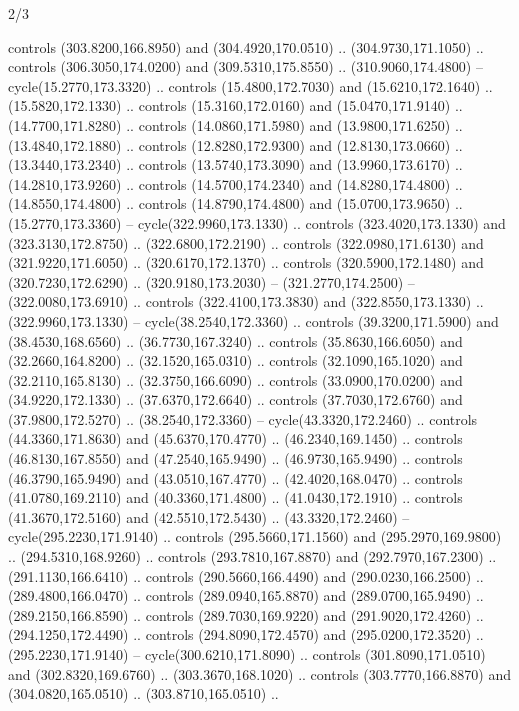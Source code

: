 \begin{flagdescription}{2/3}
\begin{scope}[xshift=0.5\flaglength,yshift=0.5\flagwidth,scale=\stretchfactor]
\begin{scope}[scale=0.001645\flagwidth,yshift=65mm,xshift=-63mm]
\begin{scope}[y=0.80pt, x=0.80pt, yscale=-1,]
\begin{scope}[cm={{1.33333,0.0,0.0,1.33333,(0.0,1e-05)}}]
  controls (303.8200,166.8950) and (304.4920,170.0510) .. (304.9730,171.1050) ..
  controls (306.3050,174.0200) and (309.5310,175.8550) .. (310.9060,174.4800) --
  cycle(15.2770,173.3320) .. controls (15.4800,172.7030) and (15.6210,172.1640)
  .. (15.5820,172.1330) .. controls (15.3160,172.0160) and (15.0470,171.9140) ..
  (14.7700,171.8280) .. controls (14.0860,171.5980) and (13.9800,171.6250) ..
  (13.4840,172.1880) .. controls (12.8280,172.9300) and (12.8130,173.0660) ..
  (13.3440,173.2340) .. controls (13.5740,173.3090) and (13.9960,173.6170) ..
  (14.2810,173.9260) .. controls (14.5700,174.2340) and (14.8280,174.4800) ..
  (14.8550,174.4800) .. controls (14.8790,174.4800) and (15.0700,173.9650) ..
  (15.2770,173.3360) -- cycle(322.9960,173.1330) .. controls (323.4020,173.1330)
  and (323.3130,172.8750) .. (322.6800,172.2190) .. controls (322.0980,171.6130)
  and (321.9220,171.6050) .. (320.6170,172.1370) .. controls (320.5900,172.1480)
  and (320.7230,172.6290) .. (320.9180,173.2030) -- (321.2770,174.2500) --
  (322.0080,173.6910) .. controls (322.4100,173.3830) and (322.8550,173.1330) ..
  (322.9960,173.1330) -- cycle(38.2540,172.3360) .. controls (39.3200,171.5900)
  and (38.4530,168.6560) .. (36.7730,167.3240) .. controls (35.8630,166.6050)
  and (32.2660,164.8200) .. (32.1520,165.0310) .. controls (32.1090,165.1020)
  and (32.2110,165.8130) .. (32.3750,166.6090) .. controls (33.0900,170.0200)
  and (34.9220,172.1330) .. (37.6370,172.6640) .. controls (37.7030,172.6760)
  and (37.9800,172.5270) .. (38.2540,172.3360) -- cycle(43.3320,172.2460) ..
  controls (44.3360,171.8630) and (45.6370,170.4770) .. (46.2340,169.1450) ..
  controls (46.8130,167.8550) and (47.2540,165.9490) .. (46.9730,165.9490) ..
  controls (46.3790,165.9490) and (43.0510,167.4770) .. (42.4020,168.0470) ..
  controls (41.0780,169.2110) and (40.3360,171.4800) .. (41.0430,172.1910) ..
  controls (41.3670,172.5160) and (42.5510,172.5430) .. (43.3320,172.2460) --
  cycle(295.2230,171.9140) .. controls (295.5660,171.1560) and
  (295.2970,169.9800) .. (294.5310,168.9260) .. controls (293.7810,167.8870) and
  (292.7970,167.2300) .. (291.1130,166.6410) .. controls (290.5660,166.4490) and
  (290.0230,166.2500) .. (289.4800,166.0470) .. controls (289.0940,165.8870) and
  (289.0700,165.9490) .. (289.2150,166.8590) .. controls (289.7030,169.9220) and
  (291.9020,172.4260) .. (294.1250,172.4490) .. controls (294.8090,172.4570) and
  (295.0200,172.3520) .. (295.2230,171.9140) -- cycle(300.6210,171.8090) ..
  controls (301.8090,171.0510) and (302.8320,169.6760) .. (303.3670,168.1020) ..
  controls (303.7770,166.8870) and (304.0820,165.0510) .. (303.8710,165.0510) ..

\end{scope}
\end{scope}
\end{scope}
\end{scope}
\end{flagdescription}
